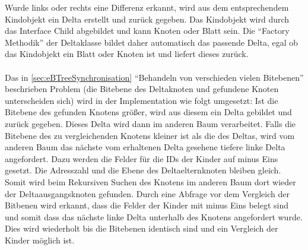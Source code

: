 \documentclass[a4paper,11pt,oneside,%
headsepline,												%
footsepline,												%
bibtotocnumbered									%
]{scrreprt}
\begin{document}
 Wurde links oder rechts eine Differenz erkannt, wird aus dem entsprechendem Kindobjekt ein Delta erstellt und zurück gegeben. Das Kindobjekt wird durch das Interface Child abgebildet und kann Knoten oder Blatt sein. Die \enquote{Factory Methodik} der Deltaklasse bildet daher automatisch das passende Delta, egal ob das Kindobjekt ein Blatt oder Knoten ist und liefert dieses zurück.\\\\
Das in \autoref{sec:eBTreeSynchronisation} \enquote{Behandeln von verschieden vielen Bitebenen} beschrieben Problem (die Bitebene des Deltaknoten und gefundene Knoten unterscheiden sich) wird in der Implementation wie folgt umgesetzt: Ist die Bitebene des gefunden Knotens größer, wird aus diesem ein Delta gebildet und zurück gegeben. Dieses Delta wird dann im anderen Baum verarbeitet. Falls die Bitebene des zu vergleichenden Knotens kleiner ist als die des Deltas, wird vom anderen Baum das nächste vom erhaltenen Delta gesehene tiefere linke Delta angefordert. Dazu werden die Felder für die IDs der Kinder auf minus Eins gesetzt. Die Adresszahl und die Ebene des Deltaelternknoten bleiben gleich. Somit wird beim Rekursiven Suchen des Knotens im anderen Baum dort wieder der Deltaausgangsknoten gefunden. Durch eine Abfrage vor dem Vergleich der Bitbenen wird erkannt, dass die Felder der Kinder mit minus Eins belegt sind und somit dass das nächste linke Delta unterhalb des Knotens angefordert wurde. Dies wird wiederholt bis die Bitebenen identisch sind und ein Vergleich der Kinder möglich ist.\\\\
\end{document}
